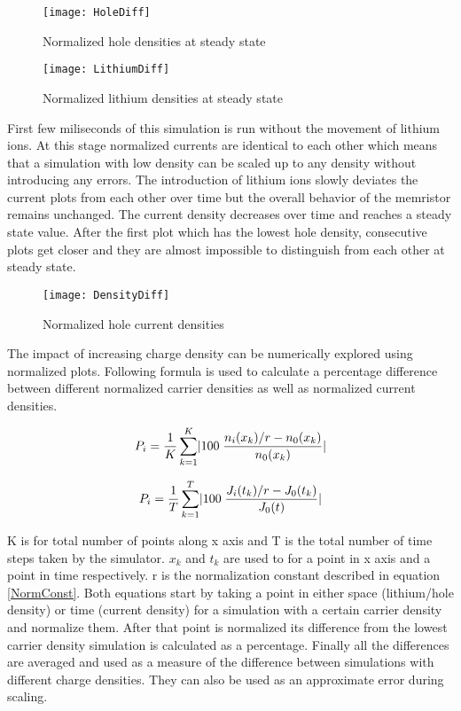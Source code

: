 \begin{doublespace}
\begin{figure}[!htp]
\centering
\texttt{[image: HoleDiff]}
\caption{Normalized hole densities at steady state} 
\label{HoleDiff}
\end{figure}

\begin{figure}[!htp]
\centering
\texttt{[image: LithiumDiff]}
\caption{Normalized lithium densities at steady state} 
\label{LithiumDiff}
\end{figure}

First few miliseconds of this simulation is run without the movement of lithium ions. At this stage normalized currents are identical to each other which means that a simulation with low density can be scaled up to any density without introducing any errors. The introduction of lithium ions slowly deviates the current plots from each other over time but the overall behavior of the memristor remains unchanged. The current density decreases over time and reaches a steady state value. After the first plot which has the lowest hole density, consecutive plots get closer and they are almost impossible to distinguish from each other at steady state.

\begin{figure}[!htp]
\centering
\texttt{[image: DensityDiff]}
\caption{Normalized hole current densities} 
\label{DensityDiff}
\end{figure}

The impact of increasing charge density can be numerically explored using normalized plots. Following formula is used to calculate a percentage difference between different normalized carrier densities as well as normalized current densities. 


\begin{equation}
\centering
P_i = \frac{1}{ K}\sum_{k=1}^{K}\lvert 100 \;\frac{n_{i}(x_k)/r-n_{0}(x_k)}{n_{0}(x_k)}\rvert
\end{equation}

\begin{equation}
\centering
P_i = \frac{1}{ T}\sum_{k=1}^{T}\lvert 100 \;\frac{J_{i}(t_k)/r-J_{0}(t_k)}{J_{0}(t)}\rvert
\end{equation}


K is for total number of points along x axis and T is the total number of time steps taken by the simulator. $x_{k}$ and $t_{k}$ are used to for a point in x axis and a point in time respectively. r is the normalization constant described in equation \ref{NormConst}. Both equations start by taking a point in either space (lithium/hole density) or time (current density) for a simulation with a certain carrier density and normalize them. After that point is normalized its difference from the lowest carrier density simulation is calculated as a percentage. Finally all the differences are averaged and used as a measure of the difference between simulations with different charge densities. They can also be used as an approximate error during scaling. 


\end{doublespace}
